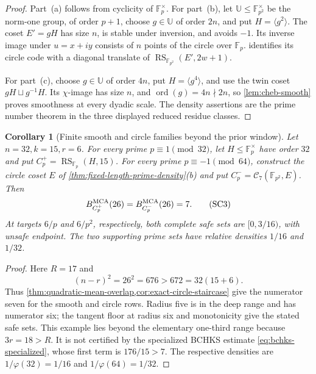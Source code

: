 \documentclass[11pt,a4paper]{amsart}
\numberwithin{equation}{section}
\newtheorem{corollary}[corollary]{Corollary}
\theoremstyle{remark}
\DeclareMathOperator{\RS}{RS}
\DeclareMathOperator{\ord}{ord}
\newcommand{\F}{\mathbb F}
\newcommand{\Ccal}{\mathcal C}
\newcommand{\UU}{\mathbb U}
\begin{document}
\begin{proof}
Part~\textup{(a)} follows from cyclicity of \(\F_p^\times\).  For
part~\textup{(b)}, let \(\UU\le\F_{p^2}^\times\) be the norm-one group,
of order \(p+1\), choose \(g\in\UU\) of order \(2n\), and put
\(H=\langle g^2\rangle\).  The coset \(E'=gH\) has size \(n\), is
stable under inversion, and avoids \(-1\).  Its inverse image under
\(u=x+iy\) consists of \(n\) points of the circle over \(\F_p\).
 identifies its circle code with a
diagonal translate of \(\RS_{\F_{p^2}}(E',2w+1)\).

For part~\textup{(c)}, choose \(g\in\UU\) of order \(4n\), put
\(H=\langle g^4\rangle\), and use the twin coset
\(gH\sqcup g^{-1}H\).  Its \(\chi\)-image has size \(n\), and
\(\ord(g)=4n\nmid2n\), so \cref{lem:cheb-smooth} proves smoothness at
every dyadic scale.  The density assertions are the prime number theorem
in the three displayed reduced residue classes.
\end{proof}

\begin{corollary}[Finite smooth and circle families beyond the prior window]
\label{cor:circle-32-family}
Let \(n=32,k=15,r=6\).  For every prime
\(p\equiv1\pmod {32}\), let \(H\le\F_p^\times\) have order \(32\)
and put \(C_p^+=\RS_{\F_p}(H,15)\).  For every prime
\(p\equiv-1\pmod {64}\), construct the circle coset \(E\) of
\cref{thm:fixed-length-prime-density}\textup{(b)} and put
\(C_p^-=\Ccal_7(\F_{p^2},E)\).  Then
\[
 B_{C_p^+}^{\rm MCA}(26)=B_{C_p^-}^{\rm MCA}(26)=7. \tag{SC3}
\]
At targets \(6/p\) and \(6/p^2\), respectively, both complete safe
sets are \([0,3/16)\), with unsafe endpoint.  The two supporting prime
sets have relative densities \(1/16\) and \(1/32\).
\end{corollary}

\begin{proof}
Here \(R=17\) and
\[
 (n-r)^2=26^2=676>672=32(15+6).
\]
Thus \cref{thm:quadratic-mean-overlap,cor:exact-circle-staircase} give
the numerator seven for the smooth and circle rows.  Radius five is in
the deep range and has numerator six; the tangent floor at radius six and
monotonicity give the stated safe sets.  This example lies
beyond the elementary one-third range because \(3r=18>R\).  It is not
certified by the specialized BCHKS estimate
\eqref{eq:bchks-specialized}, whose first term is \(176/15>7\).  The respective densities
are \(1/\varphi(32)=1/16\) and \(1/\varphi(64)=1/32\).
\end{proof}
\end{document}
